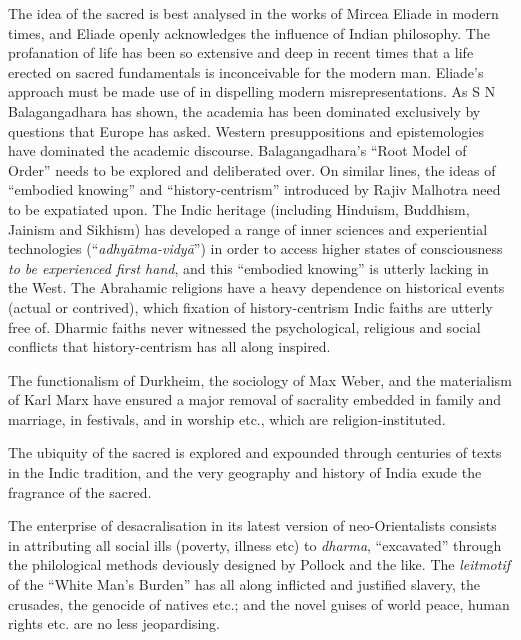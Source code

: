 The idea of the sacred is best analysed in the works of Mircea Eliade in modern times, and Eliade openly acknowledges the influence of Indian philosophy. The profanation of life has been so extensive and deep in recent times that a life erected on sacred fundamentals is inconceivable for the modern man. Eliade’s approach must be made use of in dispelling modern misrepresentations. As S N Balagangadhara has shown, the academia has been dominated exclusively by questions that Europe has asked. Western presuppositions and epistemologies have dominated the academic discourse. Balagangadhara’s “Root Model of Order” needs to be explored and deliberated over. On similar lines, the ideas of “embodied knowing” and “history-centrism” introduced by Rajiv Malhotra need to be expatiated upon. The Indic heritage (including Hinduism, Buddhism, Jainism and Sikhism) has developed a range of inner sciences and experiential technologies (“\textit{adhyātma-vidyā}”) in order to access higher states of consciousness \textit{to be experienced first hand}, and this “embodied knowing” is utterly lacking in the West. The Abrahamic religions have a heavy dependence on historical events (actual or contrived), which fixation of history-centrism Indic faiths are utterly free of. Dharmic faiths never witnessed the psychological, religious and social conflicts that history-centrism has all along inspired.

The functionalism of Durkheim, the sociology of Max Weber, and the materialism of Karl Marx have ensured a major removal of sacrality embedded in family and marriage, in festivals, and in worship etc., which are religion-instituted.

The ubiquity of the sacred is explored and expounded through centuries of texts in the Indic tradition, and the very geography and history of India exude the fragrance of the sacred.

The enterprise of desacralisation in its latest version of neo-Orientalists consists in attributing all social ills (poverty, illness etc) to \textit{dharma}, “excavated” through the philological methods deviously designed by Pollock and the like. The \textit{leitmotif} of the “White Man’s Burden” has all along inflicted and justified slavery, the crusades, the genocide of natives etc.; and the novel guises of world peace, human rights etc. are no less jeopardising.

